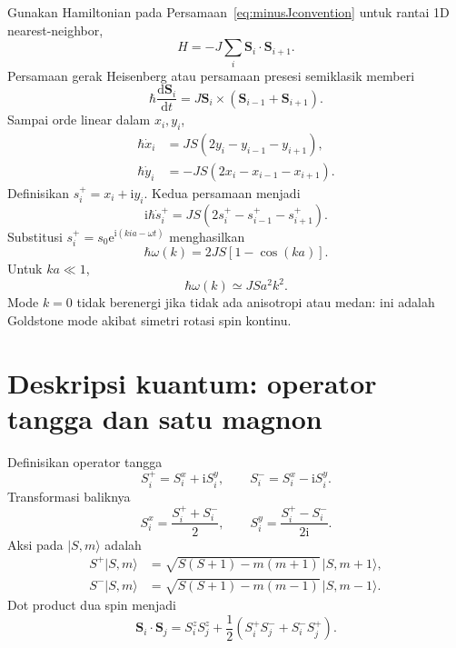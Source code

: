 \documentclass[11pt,a4paper]{article}
\newcommand{\ii}{\mathrm{i}}
\newcommand{\ee}{\mathrm{e}}
\newcommand{\dd}{\mathrm{d}}
\newcommand{\vS}{\bm S}
\begin{document}
Gunakan Hamiltonian pada Persamaan~\eqref{eq:minusJconvention} untuk rantai 1D nearest-neighbor,
\begin{equation}
H=-J\sum_i\vS_i\cdot\vS_{i+1}.
\end{equation}
Persamaan gerak Heisenberg atau persamaan presesi semiklasik memberi
\begin{equation}
\hbar\frac{\dd\vS_i}{\dd t}
=J\vS_i\times(\vS_{i-1}+\vS_{i+1}).
\end{equation}
Sampai orde linear dalam $x_i,y_i$,
\begin{align}
\hbar\dot x_i&=JS(2y_i-y_{i-1}-y_{i+1}),\\
\hbar\dot y_i&=-JS(2x_i-x_{i-1}-x_{i+1}).
\end{align}
Definisikan $s_i^+=x_i+\ii y_i$. Kedua persamaan menjadi
\begin{equation}
\ii\hbar\dot s_i^+
=JS(2s_i^+-s_{i-1}^+-s_{i+1}^+).
\end{equation}
Substitusi $s_i^+=s_0\ee^{\ii(kia-\omega t)}$ menghasilkan
\begin{equation}
\boxed{\hbar\omega(k)=2JS[1-\cos(ka)]}.
\label{eq:fm-dispersion}
\end{equation}
Untuk $ka\ll1$,
\begin{equation}
\hbar\omega(k)\simeq JSa^2k^2.
\end{equation}
Mode $k=0$ tidak berenergi jika tidak ada anisotropi atau medan: ini adalah Goldstone mode akibat simetri rotasi spin kontinu.

\section{Deskripsi kuantum: operator tangga dan satu magnon}

Definisikan operator tangga
\begin{equation}
S_i^+=S_i^x+\ii S_i^y,
\qquad
S_i^-=S_i^x-\ii S_i^y.
\end{equation}
Transformasi baliknya
\begin{equation}
S_i^x=\frac{S_i^++S_i^-}{2},
\qquad
S_i^y=\frac{S_i^+-S_i^-}{2\ii}.
\end{equation}
Aksi pada $|S,m\rangle$ adalah
\begin{align}
S^+|S,m\rangle
&=\sqrt{S(S+1)-m(m+1)}\,|S,m+1\rangle,\\
S^-|S,m\rangle
&=\sqrt{S(S+1)-m(m-1)}\,|S,m-1\rangle.
\end{align}
Dot product dua spin menjadi
\begin{equation}
\vS_i\cdot\vS_j
=S_i^zS_j^z
+\frac12(S_i^+S_j^-+S_i^-S_j^+).
\end{equation}
\end{document}
